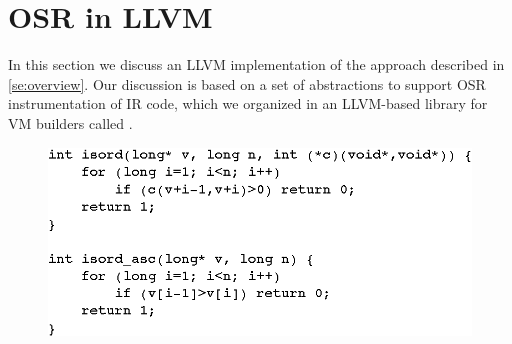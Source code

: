 
\section{OSR in LLVM}
\label{se:osr-llvm}

In this section we discuss an LLVM implementation of the approach described in \mysection\ref{se:overview}. Our discussion is based on a set of abstractions to support OSR instrumentation of IR code, which we organized in an LLVM-based library for VM builders called \osrkit.


\ifdefined\noauthorea
\begin{figure}[t]
\begin{center}
\includegraphics[width=0.9\columnwidth]{figures/isord-example/isord.eps}
\caption{\protect}
\end{center}
\end{figure}
\fi

